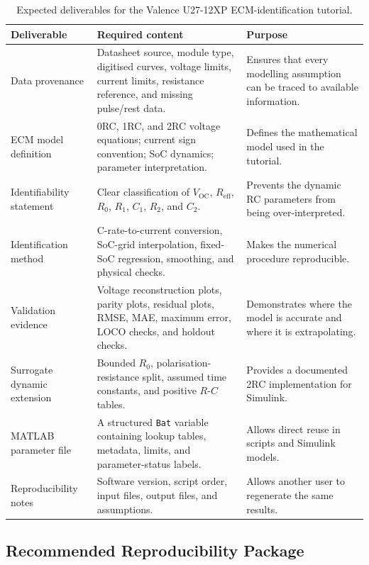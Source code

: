 \documentclass[a4paper,12pt]{article}
\begin{document}
\begin{table}[H]
\centering
\caption{Expected deliverables for the Valence U27-12XP ECM-identification tutorial.}
\label{tab:expected_deliverables_ecm}
\begin{tabularx}{0.98\textwidth}{@{}L{0.27\textwidth}Y Y@{}}
\toprule
\textbf{Deliverable} &
\textbf{Required content} &
\textbf{Purpose} \\
\midrule
Data provenance &
Datasheet source, module type, digitised curves, voltage limits, current limits, resistance reference, and missing pulse/rest data. &
Ensures that every modelling assumption can be traced to available information. \\
ECM model definition &
0RC, 1RC, and 2RC voltage equations; current sign convention; SoC dynamics; parameter interpretation. &
Defines the mathematical model used in the tutorial. \\
Identifiability statement &
Clear classification of \(V_{\mathrm{OC}}\), \(R_{\mathrm{eff}}\), \(R_0\), \(R_1\), \(C_1\), \(R_2\), and \(C_2\). &
Prevents the dynamic RC parameters from being over-interpreted. \\
Identification method &
C-rate-to-current conversion, SoC-grid interpolation, fixed-SoC regression, smoothing, and physical checks. &
Makes the numerical procedure reproducible. \\
Validation evidence &
Voltage reconstruction plots, parity plots, residual plots, RMSE, MAE, maximum error, LOCO checks, and holdout checks. &
Demonstrates where the model is accurate and where it is extrapolating. \\
Surrogate dynamic extension &
Bounded \(R_0\), polarisation-resistance split, assumed time constants, and positive \(R\)-\(C\) tables. &
Provides a documented 2RC implementation for Simulink. \\
MATLAB parameter file &
A structured \texttt{Bat} variable containing lookup tables, metadata, limits, and parameter-status labels. &
Allows direct reuse in scripts and Simulink models. \\
Reproducibility notes &
Software version, script order, input files, output files, and assumptions. &
Allows another user to regenerate the same results. \\
\bottomrule
\end{tabularx}
\end{table}

\subsection{Recommended Reproducibility Package}
\end{document}
